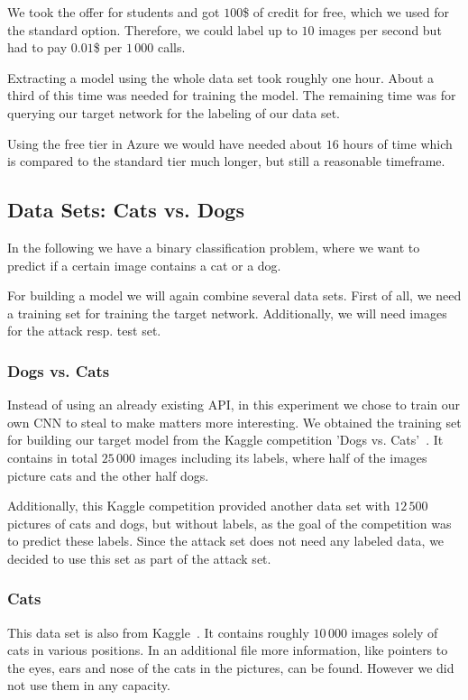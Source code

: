 \documentclass[a4paper,11pt]{article}
\begin{document}
        We took the offer for students and got $100$\$ of credit for free, which we used for the standard option. Therefore, we could label up to $10$ images per second but had to pay $0.01$\$ per $1\,000$ calls.
        
        Extracting a model using the whole data set took roughly one hour. About a third of this time was needed for training the model. The remaining time was for querying our target network for the labeling of our data set. 
        
        Using the free tier in Azure we would have needed about $16$ hours of time which is compared to the standard tier much longer, but still a reasonable timeframe. 

    \subsection{Data Sets: Cats vs. Dogs}
        In the following we have a binary classification problem, where we want to predict if a certain image contains a cat or a dog. 
        
        For building a model we will again combine several data sets. First of all, we need a training set for training the target network. Additionally, we will need images for the attack resp. test set. 
        
        \subsubsection{Dogs vs. Cats}\label{subsec:dataset_cats-dogs}
            Instead of using an already existing API, in this experiment we chose to train our own CNN to steal to make matters more interesting. We obtained the training set for building our target model from the Kaggle competition 'Dogs vs. Cats'~\cite{dogs-cats}. It contains in total $25\,000$ images including its labels, where half of the images picture cats and the other half dogs.
            
            Additionally, this Kaggle competition provided another data set with $12\,500$ pictures of cats and dogs, but without labels, as the goal of the competition was to predict these labels. Since the attack set does not need any labeled data, we decided to use this set as part of the attack set.
            
        \subsubsection{Cats} \label{subsec:dataset_cats}
            This data set is also from Kaggle~\cite{cats}. It contains roughly $10\,000$ images solely of cats in various positions. 
            In an additional file more information, like pointers to the eyes, ears and nose of the cats in the pictures, can be found. However we did not use them in any capacity. 
            
\end{document}
